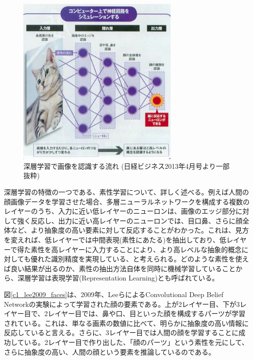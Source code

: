\begin{figure}[tbp]
 \begin{center}
  \includegraphics[width=80mm]{img/c1/nikkei}
 \end{center}
 \caption{深層学習で画像を認識する流れ (日経ビジネス2013年4月号より一部抜粋)}
 \label{c1_nikkei}
\end{figure}
深層学習の特徴の一つである、素性学習について、詳しく述べる。例えば人間の顔画像データを学習させた場合、多層ニューラルネットワークを構成する複数のレイヤーのうち、入力に近い低レイヤーのニューロンは、画像のエッジ部分に対して強く反応し、出力に近い高レイヤーのニューロンでは、目口鼻、さらに顔全体など、より抽象度の高い要素に対して反応することがわかった。これは、見方を変えれば、低レイヤーでは中間表現(素性にあたる)を抽出しており、低レイヤーで得た素性を高レイヤーに入力することにより、より高レベルな抽象的概念に対しても優れた識別精度を実現している、と考えられる。どのような素性を使えば良い結果が出るのか、素性の抽出方法自体を同時に機械学習していることから、深層学習は表現学習(Representation Learning)とも呼ばれている。\par
図\ref{c1_lee2009_faces}は、2009年、LeeらによるConvolutional Deep Belief Networkの実験によって学習された顔の要素である\cite{lee2009convolutional}。上が2レイヤー目、下が3レイヤー目で、2レイヤー目では、鼻や口、目といった顔を構成するパーツが学習されている。これは、単なる画素の数値に比べて、明らかに抽象度の高い情報に反応していると言える。さらに、3レイヤー目では人間の顔を学習することに成功している。2レイヤー目で作り出した、「顔のパーツ」という素性を元にして、さらに抽象度の高い、人間の顔という要素を推論しているのである。
